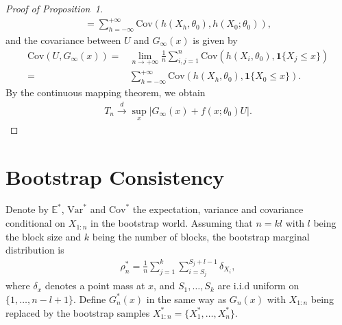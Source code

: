 \documentclass[12pt]{article}
\begin{document}
\begin{proof}[Proof of Proposition~1]
\begin{align*}
= \sum^{+\infty}_{h=-\infty}\text{Cov}(h(X_{h},\theta_0),h(X_0;\theta_0)),
\end{align*}
and the covariance between $U$ and $G_{\infty}(x)$ is given by
\begin{align*}
\text{Cov}(U,G_\infty(x))=&\lim_{n\rightarrow+\infty}
\frac{1}{n}\sum^{n}_{i,j=1}\text{Cov}(h(X_i,\theta_0),\mathbf{1}\{X_j\leq x\})
\\=&\sum^{+\infty}_{h=-\infty}\text{Cov}(h(X_{h},\theta_0),\mathbf{1}\{X_0\leq x\}).
\end{align*}
By the continuous mapping theorem, we obtain
\begin{align*}
T_n \overset{d}{\rightarrow} \sup_x |G_{\infty}(x)+f(x;\theta_0)U|.    
\end{align*}

\end{proof}

\section{Bootstrap Consistency}

Denote by $\mathbb{E}^*$, $\text{Var}^*$ and $\text{Cov}^*$
the expectation, variance and covariance conditional on $X_{1:n}$ in the bootstrap world. Assuming that $n=kl$ with $l$ being the block size and $k$ being the number of blocks, the bootstrap marginal distribution is 
\begin{align*}
\rho_n^*=\frac{1}{n}\sum^{k}_{j=1}\sum^{S_j+l-1}_{i=S_j} \delta_{X_i},    
\end{align*}
where $\delta_x$ denotes a point mass at $x$, and $S_1,\dots,S_k$ are i.i.d uniform on $\{1,\dots,n-l+1\}$. 
Define $G_n^*(x)$ in the same way as $G_n(x)$ with $X_{1:n}$ being replaced by the bootstrap samples $X_{1:n}^*=\{X_1^*,\dots,X_n^*\}$.
\end{document}

